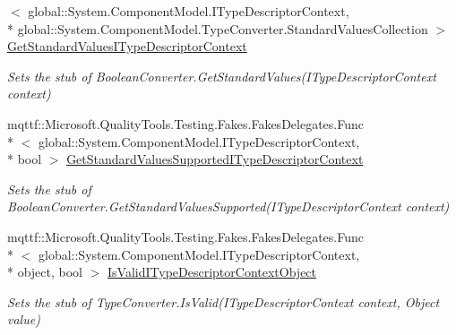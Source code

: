 \begin{DoxyCompactItemize}
$<$ global\-::\-System.\-Component\-Model.\-I\-Type\-Descriptor\-Context, \\*
global\-::\-System.\-Component\-Model.\-Type\-Converter.\-Standard\-Values\-Collection $>$ \hyperlink{class_system_1_1_component_model_1_1_fakes_1_1_stub_boolean_converter_ab1a2ce2a684e6ee6f9e61833a74ba16e}{Get\-Standard\-Values\-I\-Type\-Descriptor\-Context}
\begin{DoxyCompactList}\small\item\em Sets the stub of Boolean\-Converter.\-Get\-Standard\-Values(\-I\-Type\-Descriptor\-Context context)\end{DoxyCompactList}\item 
mqttf\-::\-Microsoft.\-Quality\-Tools.\-Testing.\-Fakes.\-Fakes\-Delegates.\-Func\\*
$<$ global\-::\-System.\-Component\-Model.\-I\-Type\-Descriptor\-Context, \\*
bool $>$ \hyperlink{class_system_1_1_component_model_1_1_fakes_1_1_stub_boolean_converter_a5ad8e2f0a1c6a9570684141004a6c719}{Get\-Standard\-Values\-Supported\-I\-Type\-Descriptor\-Context}
\begin{DoxyCompactList}\small\item\em Sets the stub of Boolean\-Converter.\-Get\-Standard\-Values\-Supported(\-I\-Type\-Descriptor\-Context context)\end{DoxyCompactList}\item 
mqttf\-::\-Microsoft.\-Quality\-Tools.\-Testing.\-Fakes.\-Fakes\-Delegates.\-Func\\*
$<$ global\-::\-System.\-Component\-Model.\-I\-Type\-Descriptor\-Context, \\*
object, bool $>$ \hyperlink{class_system_1_1_component_model_1_1_fakes_1_1_stub_boolean_converter_abb8ccc319f6c9c06777e8aace8077986}{Is\-Valid\-I\-Type\-Descriptor\-Context\-Object}
\begin{DoxyCompactList}\small\item\em Sets the stub of Type\-Converter.\-Is\-Valid(\-I\-Type\-Descriptor\-Context context, Object value)\end{DoxyCompactList}\end{DoxyCompactItemize}
